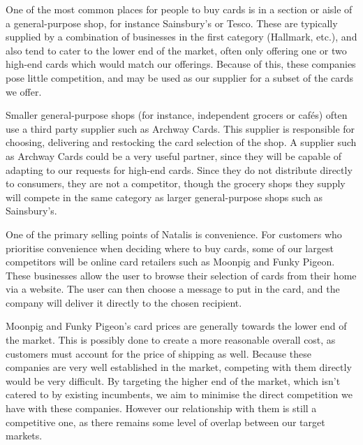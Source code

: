 \documentclass[10pt,a4paper]{article}
\begin{document}
One of the most common places for people to buy cards is in a section or aisle of a general-purpose shop, for instance Sainsbury's or Tesco. These are typically supplied by a combination of businesses in the first category (Hallmark, etc.), and also tend to cater to the lower end of the market, often only offering one or two high-end cards which would match our offerings. Because of this, these companies pose little competition, and may be used as our supplier for a subset of the cards we offer.

Smaller general-purpose shops (for instance, independent grocers or caf\'es) often use a third party supplier such as Archway Cards. This supplier is responsible for choosing, delivering and restocking the card selection of the shop. A supplier such as Archway Cards could be a very useful partner, since they will be capable of adapting to our requests for high-end cards. Since they do not distribute directly to consumers, they are not a competitor, though the grocery shops they supply will compete in the same category as larger general-purpose shops such as Sainsbury's.


One of the primary selling points of Natalis is convenience. For customers who prioritise convenience when deciding where to buy cards, some of our largest competitors will be online card retailers such as Moonpig and Funky Pigeon. These businesses allow the user to browse their selection of cards from their home via a website. The user can then choose a message to put in the card, and the company will deliver it directly to the chosen recipient.

Moonpig and Funky Pigeon's card prices are generally towards the lower end of the market. This is possibly done to create a more reasonable overall cost, as customers must account for the price of shipping as well. Because these companies are very well established in the market, competing with them directly would be very difficult. By targeting the higher end of the market, which isn't catered to by existing incumbents, we aim to minimise the direct competition we have with these companies. However our relationship with them is still a competitive one, as there remains some level of overlap between our target markets.
\end{document}
